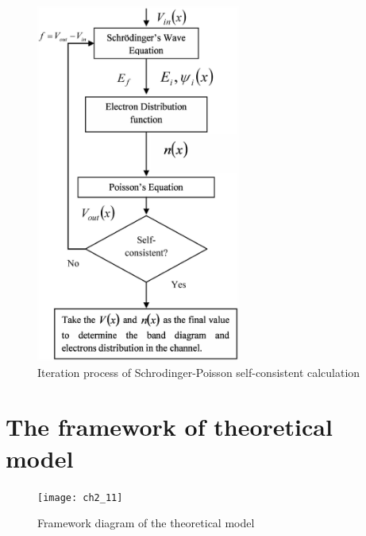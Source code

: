\begin{figure}[H] 
\centering    
\includegraphics[width=0.6\textwidth]{ch2_10}
\caption[Iteration process of Schrodinger-Poisson self-consistent calculation]{Iteration process of Schrodinger-Poisson self-consistent calculation \protect\cite{lenka20142deg}}
\label{fig:2.10}
\end{figure}

\section{The framework of theoretical model}
\label{sec:The framework of theoretical model}

\begin{figure}[H] 
\centering    
\texttt{[image: ch2\_11]}
\caption[Framework diagram of the theoretical model]{Framework diagram of the theoretical model}
\label{fig:2.11}
\end{figure}


